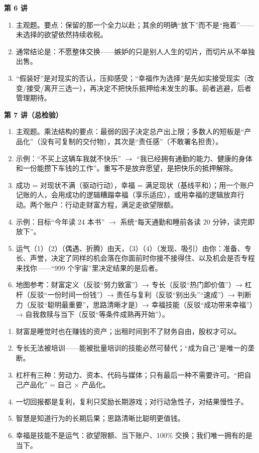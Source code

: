 \documentclass[UTF8,a4paper,11pt]{ctexart}
\begin{document}
\textbf{第 6 讲}
\begin{enumerate}
  \item 主观题。要点：保留的那一个全力以赴；其余的明确“放下”而不是“拖着”——未选择的欲望依然持续收税。
  \item 通常结论是：不愿整体交换——嫉妒的只是别人人生的切片，而切片从不单独出售。
  \item “假装好”是对现实的否认，压抑感受；“幸福作为选择”是先如实接受现实（改变/接受/离开三选一），再决定不把快乐抵押给未发生的事。前者逃避，后者管理期待。
\end{enumerate}

\textbf{第 7 讲（总检验）}
\begin{enumerate}
  \item 主观题。乘法结构的要点：最弱的因子决定总产出上限；多数人的短板是“产品化”（没有可复制的交付物），其次是“责任感”（不敢署名担责）。
  \item 示例：“不买上这辆车我就不快乐” $\rightarrow$ “我已经拥有通勤的能力、健康的身体和一份能攒下车钱的工作”。重写不是放弃愿望，是把快乐的抵押解除。
  \item 成功 = 对现状不满（驱动行动），幸福 = 满足现状（基线平和）；用一个账户记账的人，会用成功的逻辑糟蹋幸福（享乐适应），或用幸福的逻辑放弃行动。两个账户：行动走财富方程，满足走欲望限额。
  \item 示例：目标“今年读 24 本书” $\rightarrow$ 系统“每天通勤和睡前各读 20 分钟，读完即放下”。
  \item 运气（1）（2）（偶遇、折腾）由天，（3）（4）（发现、吸引）由你：准备、专长、声誉，决定了同样的机会落在你面前时你接不接得住、以及机会是否专程来找你——“999 个宇宙”里决定结果的是后者。
  \item 地图参考：财富定义（反驳“努力致富”）→ 专长（反驳“热门即价值”）→ 杠杆（反驳“一份时间一份钱”）→ 责任与复利（反驳“别出头”“速成”）→ 判断力（反驳“聪明最重要”，思路清晰才是）→ 幸福技能（反驳“成功带来幸福”）→ 自我救赎与当下（反驳“等条件成熟再开始”）。
\end{enumerate}

\vspace{1em}
\begin{keyconcept}
\begin{enumerate}
  \item 财富是睡觉时也在赚钱的资产；出租时间到不了财务自由，股权才可以。
  \item 专长无法被培训——能被批量培训的技能必然可替代；“成为自己”是唯一的垄断。
  \item 杠杆有三种：劳动力、资本、代码与媒体；只有最后一种不需要许可。“把自己产品化” = 自己 $\times$ 产品化。
  \item 一切回报都是复利，复利只奖励长期游戏；对行动急性子，对结果慢性子。
  \item 智慧是知道行为的长期后果；思路清晰比聪明更值钱。
  \item 幸福是技能不是运气：欲望限额、当下账户、100\% 交换；我们唯一拥有的是当下。
\end{enumerate}
\end{keyconcept}
\end{document}

